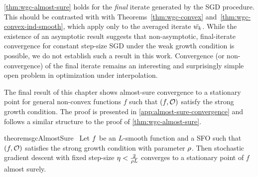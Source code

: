 \autoref{thm:wgc-almost-sure} holds for the \emph{final} iterate generated by the \ac{SGD} procedure.
This should be contrasted with with Theorems~\ref{thm:wgc-convex} and~\ref{thm:wgc-convex-ind-smooth}, which apply only to the averaged iterate \( \bar \wk \).
While the existence of an asymptotic result suggests that non-asymptotic, final-iterate convergence for constant step-size \ac{SGD} under the weak growth condition is possible, we do not establish such a result in this work. 
Convergence (or non-convergence) of the final iterate remains an interesting and surprisingly simple open problem in optimization under interpolation.

The final result of this chapter shows almost-sure convergence to a stationary point for general non-convex functions \( f \) such that \( \rbr{f, \oracle{}} \) satisfy the strong growth condition.
The proof is presented in \autoref{app:almost-sure-convergence} and follows a similar structure to the proof of \autoref{thm:wgc-almost-sure}.

\begin{restatable}{theorem}{sgcAlmostSure}~\label{thm:sgc-almost-sure}
    Let \( \f \) be an \( L \)-smooth function and \oracle{} a SFO such that \( \rbr{f, \oracle{}} \) satisfies the strong growth condition with parameter \( \sgc \).
    Then stochastic gradient descent with fixed step-size \(\eta < \frac{2}{\sgc L} \) converges to a stationary point of \( f \) almost surely.
\end{restatable}

\endinput

